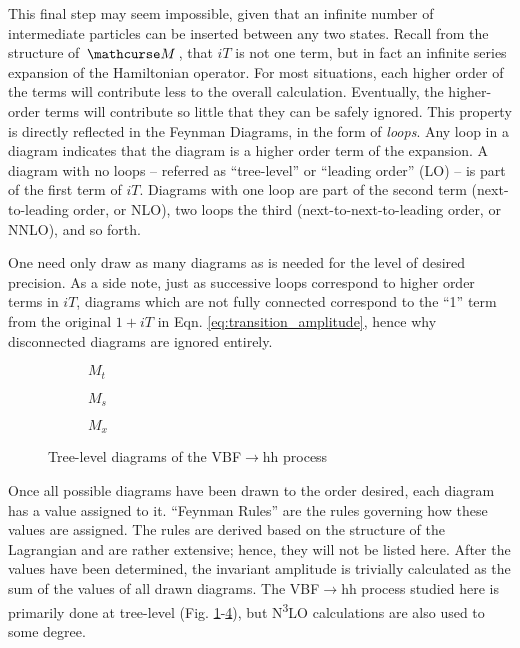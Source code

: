     This final step may seem impossible, given that an infinite number of intermediate particles can be inserted between any two states.
    Recall from the structure of $\invAmp$, that $iT$ is not one term, but in fact an infinite series expansion of the Hamiltonian operator.
    For most situations, each higher order of the terms will contribute less to the overall calculation.
    Eventually, the higher-order terms will contribute so little that they can be safely ignored.
    This property is directly reflected in the Feynman Diagrams, in the form of \textit{loops}.
    Any loop in a diagram indicates that the diagram is a higher order term of the expansion.
    A diagram with no loops -- referred as ``tree-level'' or ``leading order'' (LO) -- is part of the first term of $iT$.
    Diagrams with one loop are part of the second term (next-to-leading order, or NLO),
        two loops the third (next-to-next-to-leading order, or NNLO), and so forth.

    One need only draw as many diagrams as is needed for the level of desired precision.
    As a side note, just as successive loops correspond to higher order terms in $iT$,
        diagrams which are not fully connected correspond to the ``1'' term from the original $1+iT$ in Eqn. \ref{eq:transition_amplitude},
        hence why disconnected diagrams are ignored entirely.

    \begin{figure}
    \centering
    \begin{subfigure}{0.32\textwidth} 
         
        \caption{$M_t$}
        \label{fig:tree_level_vbfhh:kv}
    \end{subfigure}
    \begin{subfigure}{0.32\textwidth}
         
        \caption{$M_s$}
        \label{fig:tree_level_vbfhh:kl}
    \end{subfigure}
    \begin{subfigure}{0.32\textwidth}
         
        \caption{$M_x$}
        \label{fig:tree_level_vbfhh:k2v}
    \end{subfigure}
    \caption{Tree-level diagrams of the VBF$\rightarrow$hh process}
    \end{figure}

    Once all possible diagrams have been drawn to the order desired, each diagram has a value assigned to it.
    ``Feynman Rules'' are the rules governing how these values are assigned.
    The rules are derived based on the structure of the Lagrangian and are rather extensive;
        hence, they will not be listed here.
    After the values have been determined, the invariant amplitude is trivially calculated as the sum of the values of all drawn diagrams.
    The VBF$\to$hh process studied here is primarily done at tree-level
        (Fig. \ref{fig:tree_level_vbfhh:kv}-\ref{fig:tree_level_vbfhh:k2v}),
        but N\textsuperscript{3}LO calculations are also used to some degree.

